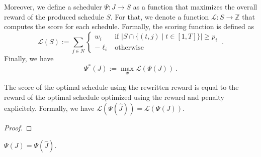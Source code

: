 Moreover, we define a scheduler $\Psi: J \rightarrow S$ as a function that maximizes the overall reward of the produced schedule $S$. For that, we denote a function $\mathcal{L}: S \rightarrow \mathbb{Z}$ that computes the score for each schedule. Formally, the scoring function is defined as 
\begin{equation}
    \mathcal{L}(S) := \sum_{j \in N} 
    \begin{cases}
    w_i \quad  &\text{if } |S \cap \{(t, j) \mid t\in [1, T]\}| \geq p_i \\
    -\ell_i &\text{otherwise}
    \end{cases} \ .
    \label{eq:scoring}
\end{equation}
Finally, we have 
\begin{equation}
    \Psi^*(J) := \max_\Psi \mathcal{L}(\Psi(J)) \ .
    \label{eq:scheduler}
\end{equation}

\begin{theorem}
    The score of the optimal schedule using the rewritten reward is equal to the reward of the optimal schedule optimized using the reward and penalty explicitely. 
    Formally, we have $\mathcal{L}(\Psi(\hat{J})) = \mathcal{L}(\Psi({J}))$.
\end{theorem}

\begin{proof}


\end{proof}

\begin{theorem}
    $\Psi(J) = \Psi(\hat{J})$.
\end{theorem}

